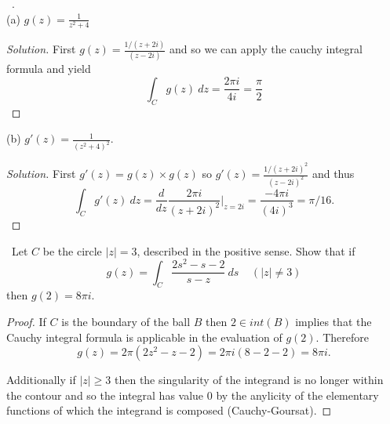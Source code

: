 \documentclass[11pt]{amsart}
\theoremstyle{definition}
\numberwithin{theorem}{section}
\numberwithin{definition}{section}
\numberwithin{equation}{section}
\newenvironment{solution}
  {\begin{proof}[Solution]}
  {\end{proof}}
\begin{document}
\medskip {}\ . \\
(a) $g(z) = \frac{1}{z^2 + 4}$
\begin{solution}
	First $g(z) = \frac{1/(z+2i)}{(z-2i)}$ and so we can apply the cauchy integral formula and yield
	\begin{equation*}
		\int_C g(z)\ dz = \frac{2\pi i}{4i} = \frac{\pi}{2}
	\end{equation*}
\end{solution}
(b) $g'(z) = \frac{1}{(z^2 + 4)^2}.$
\begin{solution}
	First $g'(z) = g(z)\times g(z)$ so $g'(z) = \frac{1/(z+2i)^2}{(z-2i)^2}$ and thus
	\begin{equation*}
		\int_C g'(z)\ dz =  \frac{d}{dz} \frac{2\pi i}{(z+2i)^2}\Big|_{z = 2i}  = \frac{-4\pi i}{(4i)^3} =\pi/16.
	\end{equation*}
\end{solution}



\medskip {}\ Let $C$ be the circle $|z| = 3$, described in the positive sense. Show that if
\begin{equation*}
	g(z) = \int_C \frac{2s^2 - s - 2}{s-z}\ ds\;\;\;\;(|z| \neq 3)
\end{equation*}
then $g(2) = 8\pi i$.
\begin{proof}
	If $C$ is the boundary of the ball $B$ then $2 \in int(B)$ implies that the Cauchy integral formula is applicable in the evaluation of $g(2).$ Therefore
	\begin{equation*}
		g(z) = 2\pi (2z^2 - z - 2) = 2\pi i(8 -2 -2) = 8 \pi i.
	\end{equation*}

	Additionally if $|z| \geq 3$ then the singularity of the integrand is no longer within the contour and so the integral has value $0$ by the anylicity of the elementary functions of which the integrand is composed (Cauchy-Goursat).
\end{proof}
\end{document}
